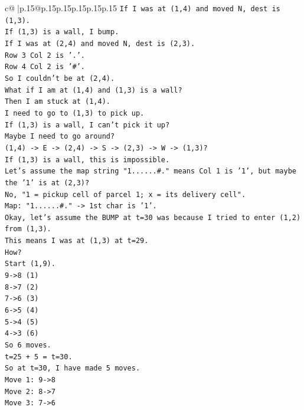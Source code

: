 \documentclass{article}
\begin{document}
{\begin{supertabular}{c@{$\;$}|p{.15\linewidth}@{}p{.15\linewidth}p{.15\linewidth}p{.15\linewidth}p{.15\linewidth}p{.15\linewidth}}
{{{\texttt{If I was at (1,4) and moved N, dest is (1,3).} \\
\texttt{If (1,3) is a wall, I bump.} \\
\texttt{If I was at (2,4) and moved N, dest is (2,3).} \\
\texttt{Row 3 Col 2 is '.'.} \\
\texttt{Row 4 Col 2 is '\#'.} \\
\texttt{So I couldn't be at (2,4).} \\
\texttt{What if I am at (1,4) and (1,3) is a wall?} \\
\texttt{Then I am stuck at (1,4).} \\
\texttt{I need to go to (1,3) to pick up.} \\
\texttt{If (1,3) is a wall, I can't pick it up?} \\
\texttt{Maybe I need to go around?} \\
\texttt{(1,4) {-}> E {-}> (2,4) {-}> S {-}> (2,3) {-}> W {-}> (1,3)?} \\
\texttt{If (1,3) is a wall, this is impossible.} \\
\texttt{Let's assume the map string "1......\#." means Col 1 is '1', but maybe the '1' is at (2,3)?} \\
\texttt{No, "1 = pickup cell of parcel 1; x = its delivery cell".} \\
\texttt{Map: "1......\#." {-}> 1st char is '1'.} \\
\texttt{Okay, let's assume the BUMP at t=30 was because I tried to enter (1,2) from (1,3).} \\
\texttt{This means I was at (1,3) at t=29.} \\
\texttt{How?} \\
\texttt{Start (1,9).} \\
\texttt{9{-}>8 (1)} \\
\texttt{8{-}>7 (2)} \\
\texttt{7{-}>6 (3)} \\
\texttt{6{-}>5 (4)} \\
\texttt{5{-}>4 (5)} \\
\texttt{4{-}>3 (6)} \\
\texttt{So 6 moves.} \\
\texttt{t=25 + 5 = t=30.} \\
\texttt{So at t=30, I have made 5 moves.} \\
\texttt{Move 1: 9{-}>8} \\
\texttt{Move 2: 8{-}>7} \\
\texttt{Move 3: 7{-}>6} \\
}}}
\end{supertabular}}
\end{document}
